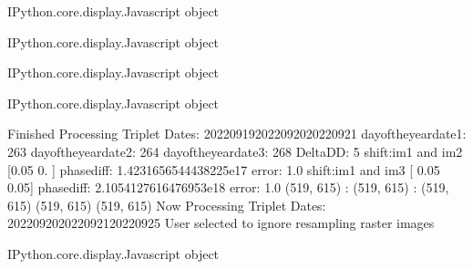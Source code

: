 \documentclass[letterpaper,10pt]{sphinxmanual}
\begin{document}
\begin{sphinxVerbatim}[commandchars=\\\{\}]
\PYGZlt{}IPython.core.display.Javascript object\PYGZgt{}
\end{sphinxVerbatim}



\begin{sphinxVerbatim}[commandchars=\\\{\}]
\PYGZlt{}IPython.core.display.Javascript object\PYGZgt{}
\end{sphinxVerbatim}



\begin{sphinxVerbatim}[commandchars=\\\{\}]
\PYGZlt{}IPython.core.display.Javascript object\PYGZgt{}
\end{sphinxVerbatim}



\begin{sphinxVerbatim}[commandchars=\\\{\}]
\PYGZlt{}IPython.core.display.Javascript object\PYGZgt{}
\end{sphinxVerbatim}



\begin{sphinxVerbatim}[commandchars=\\\{\}]
Finished Processing Triplet Dates:  20220919\PYGZhy{}20220920\PYGZhy{}20220921
day\PYGZus{}of\PYGZus{}the\PYGZus{}year\PYGZus{}date1:  263
\PYGZhy{}\PYGZhy{}\PYGZhy{}\PYGZhy{}\PYGZhy{}\PYGZhy{}\PYGZhy{}\PYGZhy{}\PYGZhy{}\PYGZhy{}\PYGZhy{}\PYGZhy{}\PYGZhy{}\PYGZhy{}\PYGZhy{}\PYGZhy{}\PYGZhy{}\PYGZhy{}\PYGZhy{}\PYGZhy{}\PYGZhy{}
day\PYGZus{}of\PYGZus{}the\PYGZus{}year\PYGZus{}date2:  264
\PYGZhy{}\PYGZhy{}\PYGZhy{}\PYGZhy{}\PYGZhy{}\PYGZhy{}\PYGZhy{}\PYGZhy{}\PYGZhy{}\PYGZhy{}\PYGZhy{}\PYGZhy{}\PYGZhy{}\PYGZhy{}\PYGZhy{}\PYGZhy{}\PYGZhy{}\PYGZhy{}\PYGZhy{}\PYGZhy{}\PYGZhy{}
day\PYGZus{}of\PYGZus{}the\PYGZus{}year\PYGZus{}date3:  268
\PYGZhy{}\PYGZhy{}\PYGZhy{}\PYGZhy{}\PYGZhy{}\PYGZhy{}\PYGZhy{}\PYGZhy{}\PYGZhy{}\PYGZhy{}\PYGZhy{}\PYGZhy{}\PYGZhy{}\PYGZhy{}\PYGZhy{}\PYGZhy{}\PYGZhy{}\PYGZhy{}\PYGZhy{}\PYGZhy{}\PYGZhy{}
Delta\PYGZus{}DD: 5
shift:im1 and im2 [0.05 0.  ] phasediff: 1.4231656544438225e\PYGZhy{}17 error: 1.0
shift:im1 and im3 [ 0.05 \PYGZhy{}0.05] phasediff: 2.1054127616476953e\PYGZhy{}18 error: 1.0
(519, 615) :  (519, 615) :  (519, 615)
(519, 615)
(519, 615)
Now Processing Triplet Dates:  20220920\PYGZhy{}20220921\PYGZhy{}20220925
 User selected to ignore resampling raster images 



\PYGZlt{}IPython.core.display.Javascript object\PYGZgt{}
\end{sphinxVerbatim}
\end{document}

